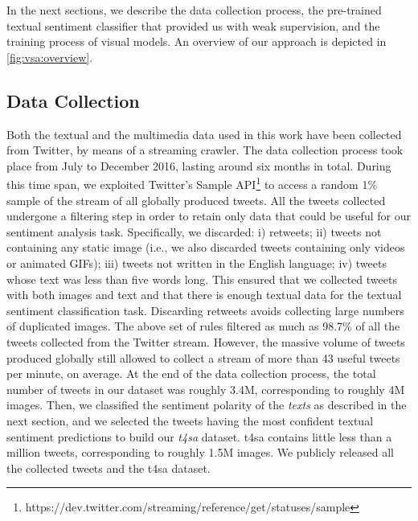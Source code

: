 In the next sections, we describe the data collection process, the pre-trained textual sentiment classifier that provided us with weak supervision, and the training process of visual models.
An overview of our approach is depicted in \ref{fig:vsa:overview}.



\subsection{Data Collection}
\label{subsec:vsa:dataset}
Both the textual and the multimedia data used in this work have been collected from Twitter, by means of a streaming crawler.
The data collection process took place from July to December 2016, lasting around six months in total.
During this time span, we exploited Twitter's Sample API\footnote{https://dev.twitter.com/streaming/reference/get/statuses/sample} to access a random 1\% sample of the stream of all globally produced tweets.
All the tweets collected undergone a filtering step in order to retain only data that could be useful for our sentiment analysis task.
Specifically, we discarded: i) retweets; ii) tweets not containing any static image (i.e., we also discarded tweets containing only videos or animated GIFs); iii) tweets not written in the English language; iv) tweets whose text was less than five words long.
This ensured that we collected tweets with both images and text and that there is enough textual data for the textual sentiment classification task.
Discarding retweets avoids collecting large numbers of duplicated images.
The above set of rules filtered as much as 98.7\% of all the tweets collected from the Twitter stream.
However, the massive volume of tweets produced globally still allowed to collect a stream of more than 43 useful tweets per minute, on average.
At the end of the data collection process, the total number of tweets in our dataset was roughly 3.4M, corresponding to roughly 4M images.
Then, we classified the sentiment polarity of the \emph{texts} as described in the next section, and we selected the tweets having the most confident textual sentiment predictions to build our \emph{\acrfull{t4sa}} dataset.
\gls{t4sa} contains little less than a million tweets, corresponding to roughly 1.5M images.
We publicly released all the collected tweets and the \gls{t4sa} dataset.

